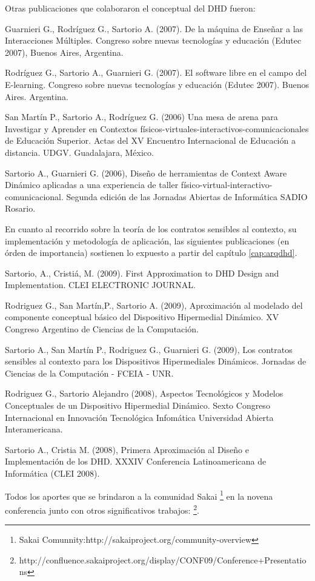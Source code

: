 Otras publicaciones que colaboraron el conceptual del DHD fueron:

Guarnieri G., Rodríguez G., Sartorio A. (2007). De la máquina de Enseñar
a las Interacciones Múltiples. Congreso sobre nuevas tecnologías y educación
(Edutec 2007), Buenos Aires, Argentina.

Rodríguez G., Sartorio A., Guarnieri G. (2007). El software libre en el
campo del E-learning. Congreso sobre nuevas tecnologías y educación (Edutec
2007). Buenos Aires. Argentina.

San Martín P., Sartorio A., Rodríguez G. (2006) Una mesa de arena para
Investigar y Aprender en
Contextos físicos-virtuales-interactivos-comunicacionales de Educación Superior.
Actas del XV Encuentro Internacional de Educación a distancia. UDGV.
Guadalajara, México.

Sartorio A., Guarnieri G. (2006), Diseño de herramientas de Context Aware
Dinámico aplicadas a una experiencia de
taller físico-virtual-interactivo-comunicacional. Segunda edición de las
Jornadas Abiertas de Informática SADIO Rosario.

En cuanto al recorrido sobre la teoría de los contratos sensibles al contexto,
su implementación y metodología de aplicación, las siguientes publicaciones (en
órden de importancia) sostienen lo expuesto a partir del
capítulo \ref{cap:arqdhd}.

Sartorio, A., Cristiá, M. (2009). First Approximation to DHD Design and
Implementation. CLEI ELECTRONIC JOURNAL.

Rodriguez G., San Martín,P., Sartorio A. (2009), Aproximación al modelado del
componente conceptual básico del Dispositivo Hipermedial Dinámico. XV Congreso
Argentino de Ciencias de la Computación.  

Sartorio A., San Martín P.,  Rodriguez G., Guarnieri G. (2009),  Los contratos
sensibles al contexto para los Dispositivos Hipermediales Dinámicos. Jornadas de
Ciencias de la Computación - FCEIA - UNR.

Rodriguez G., Sartorio Alejandro (2008),  Aspectos Tecnológicos y
Modelos Conceptuales de un Dispositivo Hipermedial Dinámico. Sexto
Congreso Internacional en Innovación Tecnológica Infomática Universidad
Abierta Interamericana.

Sartorio A., Cristia M. (2008),  Primera Aproximación al Diseño e Implementación
de los DHD.   XXXIV Conferencia Latinoamericana de Informática (CLEI 2008).


Todos los aportes que se brindaron a la comunidad Sakai
\footnote{Sakai Comunnity:http://sakaiproject.org/community-overview} en la
novena conferencia junto con otros significativos trabajos: \footnote{
http://confluence.sakaiproject.org/display/CONF09/Conference+Presentations}. 

